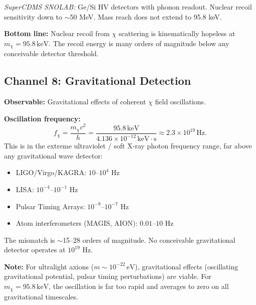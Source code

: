 \documentclass[12pt,a4paper]{article}
\newcommand{\keV}{\,\mathrm{keV}}
\newcommand{\eV}{\,\mathrm{eV}}
\begin{document}
\emph{SuperCDMS SNOLAB:} Ge/Si HV detectors with phonon readout.
Nuclear recoil sensitivity down to $\sim$50 MeV. Mass reach does
not extend to 95.8 keV.

\textbf{Bottom line:} Nuclear recoil from $\chi$ scattering is
kinematically hopeless at $m_\chi = 95.8\keV$. The recoil energy is
many orders of magnitude below any conceivable detector threshold.

\begin{center}
\end{center}

\subsection{Channel 8: Gravitational Detection}
\label{sec:grav}

\textbf{Observable:} Gravitational effects of coherent $\chi$
field oscillations.

\textbf{Oscillation frequency:}
\begin{equation}
f_\chi = \frac{m_\chi c^2}{h}
= \frac{95.8\keV}{4.136 \times 10^{-12}\keV\cdot\mathrm{s}}
\approx 2.3 \times 10^{19}\,\mathrm{Hz}.
\end{equation}
This is in the extreme ultraviolet / soft X-ray photon frequency range,
far above any gravitational wave detector:

\begin{itemize}
\item LIGO/Virgo/KAGRA: $10$--$10^4$ Hz
\item LISA: $10^{-4}$--$10^{-1}$ Hz
\item Pulsar Timing Arrays: $10^{-9}$--$10^{-7}$ Hz
\item Atom interferometers (MAGIS, AION): $0.01$--$10$ Hz
\end{itemize}

The mismatch is $\sim$15--28 orders of magnitude. No conceivable
gravitational detector operates at $10^{19}$ Hz.

\textbf{Note:} For ultralight axions ($m \sim 10^{-22}\eV$),
gravitational effects (oscillating gravitational potential, pulsar
timing perturbations) are viable. For $m_\chi = 95.8\keV$, the
oscillation is far too rapid and averages to zero on all gravitational
timescales.

\begin{center}
\end{center}
\end{document}
